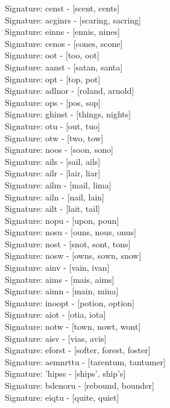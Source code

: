Signature: {censt} - [scent, cents] \\
Signature: {acginrs} - [scaring, sacring] \\
Signature: {einns} - [ennis, nines] \\
Signature: {cenos} - [cones, scone] \\
Signature: {oot} - [too, oot] \\
Signature: {aanst} - [satan, santa] \\
Signature: {opt} - [top, pot] \\
Signature: {adlnor} - [roland, arnold] \\
Signature: {ops} - [pos, sop] \\
Signature: {ghinst} - [things, nights] \\
Signature: {otu} - [out, tuo] \\
Signature: {otw} - [two, tow] \\
Signature: {noos} - [soon, sono] \\
Signature: {ails} - [sail, ails] \\
Signature: {ailr} - [lair, liar] \\
Signature: {ailm} - [mail, lima] \\
Signature: {ailn} - [nail, lain] \\
Signature: {ailt} - [lait, tail] \\
Signature: {nopu} - [upon, poun] \\
Signature: {nosu} - [ouns, nous, onus] \\
Signature: {nost} - [snot, sont, tons] \\
Signature: {nosw} - [owns, sown, snow] \\
Signature: {ainv} - [vain, ivan] \\
Signature: {aims} - [mais, aims] \\
Signature: {aimn} - [main, mina] \\
Signature: {inoopt} - [potion, option] \\
Signature: {aiot} - [otia, iota] \\
Signature: {notw} - [town, nowt, wont] \\
Signature: {aisv} - [vias, avis] \\
Signature: {eforst} - [softer, forest, foster] \\
Signature: {aemnrttu} - [tarentum, tantumer] \\
Signature: {'hipss} - [ships', ship's] \\
Signature: {bdenoru} - [rebound, bounder] \\
Signature: {eiqtu} - [quite, quiet] \\

